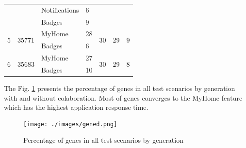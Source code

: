 \begin{table}[h]
\begin{tabular}{|p{0.2cm}|l|l|l|p{0.60cm}|p{0.60cm}|p{0.60cm}|}
                   &                        & Notifications & 6               &                     &                     &                     \\ \cline{3-4}
                   &                        & Badges        & 9               &                     &                     &                     \\ \hline
\multirow{2}{*}{5} & \multirow{2}{*}{35771} & MyHome        & 28              & \multirow{2}{*}{30} & \multirow{2}{*}{29} & \multirow{2}{*}{9}  \\ \cline{3-4}
                   &                        & Badges        & 6               &                     &                     &                     \\ \hline
\multirow{2}{*}{6} & \multirow{2}{*}{35683} & MyHome        & 27              & \multirow{2}{*}{30} & \multirow{2}{*}{29} & \multirow{2}{*}{8}  \\ \cline{3-4}
                   &                        & Badges        & 10              &                     &                     &                     \\ \hline
\end{tabular}
\end{table}


The Fig. \ref{fig:gened} presents the percentage of genes in all test scenarios by generation with and without colaboration. Most of genes converges to the MyHome feature which has the highest application response time.

\begin{figure}[h]
\centering
\caption{Percentage of genes in all test scenarios by generation }
\texttt{[image: ./images/gened.png]}
\label{fig:gened}
\end{figure}

 